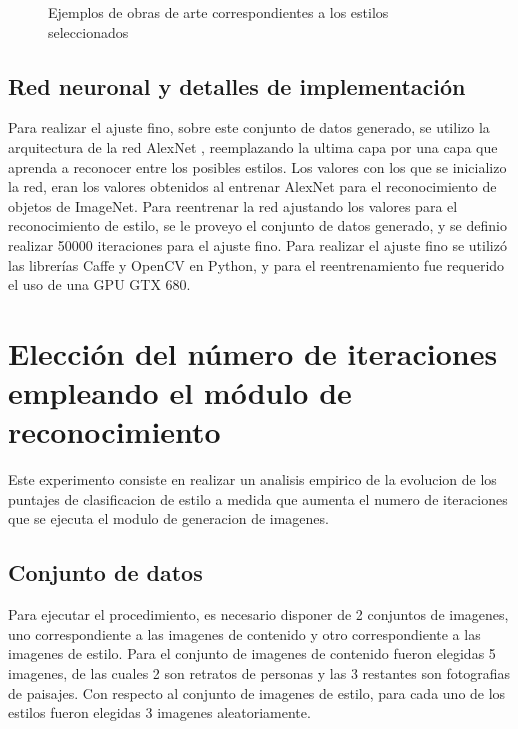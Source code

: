 \documentclass[a4paper,11pt,spanish]{book}
\begin{document}
\begin{figure}
\begin{center}
\begin{tabularx}{\textwidth}{@{}cXX@{}}
	  \end{tabularx}

	  \caption{Ejemplos de obras de arte correspondientes a los estilos seleccionados}\label{mosaico_estilos}
	  \end{center}

	\end{figure}

    \subsection{Red neuronal y detalles de implementación}
      Para realizar el ajuste fino, sobre este conjunto de datos generado, se utilizo la arquitectura de la red AlexNet \cite{AlexNet}, 
      reemplazando la ultima capa por una capa que aprenda a reconocer entre los posibles estilos. 
      Los valores con los que se inicializo la red, eran los valores obtenidos al entrenar AlexNet para el reconocimiento de objetos de ImageNet.
      Para reentrenar la red ajustando los valores para el reconocimiento de estilo, se le proveyo el conjunto de datos generado, y se definio realizar 50000 iteraciones para el ajuste fino.
      Para realizar el ajuste fino se utilizó las librerías Caffe y OpenCV en Python, y para el reentrenamiento fue requerido el uso de una GPU GTX 680.

  \section{Elección del número de iteraciones empleando el módulo de reconocimiento}
    Este experimento consiste en realizar un analisis empirico de la evolucion de los puntajes de clasificacion de estilo a medida que aumenta el numero de iteraciones
    que se ejecuta el modulo de generacion de imagenes.
    \subsection{Conjunto de datos}
      Para ejecutar el procedimiento, es necesario disponer de 2 conjuntos de imagenes, uno correspondiente a las imagenes de contenido y otro correspondiente a las imagenes de estilo.
      Para el conjunto de imagenes de contenido fueron elegidas 5 imagenes, de las cuales 2 son retratos de personas y las 3 restantes son fotografias de paisajes.
      Con respecto al conjunto de imagenes de estilo, para cada uno de los estilos fueron elegidas 3 imagenes aleatoriamente.
\end{document}
